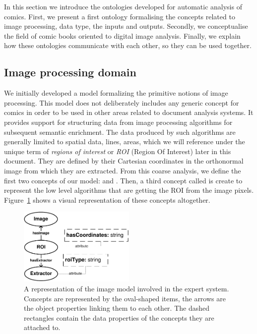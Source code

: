 In this section we introduce the ontologies developed for automatic analysis of comics.
First, we present a first ontology formalising the concepts related to image processing, data type, the inputs and outputs.
Secondly, we conceptualise the field of comic books oriented to digital image analysis.
Finally, we explain how these ontologies communicate with each other, so they can be used together.

\subsection{Image processing domain} %
\label{sub:kn:image_processing_domain}

We initially developed a model formalizing the primitive notions of image processing.
This model does not deliberately includes any generic concept for comics in order to be used in other areas related to document analysis systems.
It provides support for structuring data from image processing algorithms for subsequent semantic enrichment.
The data produced by such algorithms are generally limited to spatial data, lines, areas, which we will reference under the unique term of \textit{regions of interest} or \textit{ROI} (Region Of Interest) later in this document.
They are defined by their Cartesian coordinates in the orthonormal image from which they are extracted.
From this coarse analysis, we define the first two concepts of our model:  and .
Then, a third concept called  is create to represent the low level algorithms that are getting the ROI from the image pixels.
Figure~\ref{fig:kn:model_image} shows a visual representation of these concepts altogether.

 \begin{figure}[!ht]
   \centering
  \includegraphics[width=0.5\textwidth]{model_image.pdf}
  \caption[A representation of the image model involved in the expert system]{A representation of the image model involved in the expert system. Concepts are represented by the oval-shaped items, the arrows are the object properties linking them to each other. The dashed rectangles contain the data properties of the concepts they are attached to.}
  \label{fig:kn:model_image}
 \end{figure}


